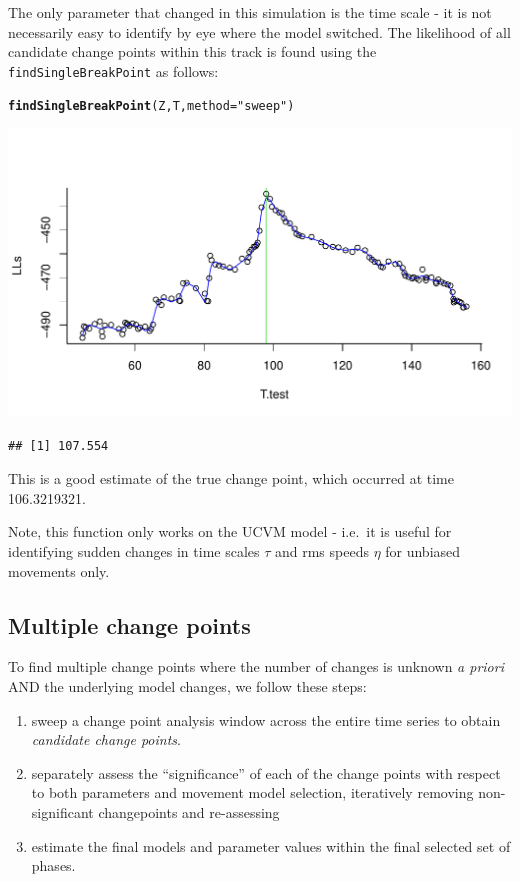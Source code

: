 \documentclass[10pt]{article}\usepackage[]{graphicx}\usepackage[]{color}
\makeatletter
\def\maxwidth{ %
  \ifdim\Gin@nat@width>\linewidth
    \linewidth
  \else
    \Gin@nat@width
  \fi
}
\newcommand{\hlstr}[1]{\textcolor[rgb]{0.192,0.494,0.8}{#1}}%
\newcommand{\hlstd}[1]{\textcolor[rgb]{0.345,0.345,0.345}{#1}}%
\newcommand{\hlkwc}[1]{\textcolor[rgb]{0.333,0.667,0.333}{#1}}%
\newcommand{\hlkwd}[1]{\textcolor[rgb]{0.737,0.353,0.396}{\textbf{#1}}}%
\newenvironment{kframe}{%
 \def\at@end@of@kframe{}%
 \ifinner\ifhmode%
  \def\at@end@of@kframe{\end{minipage}}%
  \begin{minipage}{\columnwidth}%
 \fi\fi%
 \def\FrameCommand##1{\hskip\@totalleftmargin \hskip-\fboxsep
 \colorbox{shadecolor}{##1}\hskip-\fboxsep
     \hskip-\linewidth \hskip-\@totalleftmargin \hskip\columnwidth}%
 \MakeFramed {\advance\hsize-\width
   \@totalleftmargin\z@ \linewidth\hsize
   \@setminipage}}%
 {\par\unskip\endMakeFramed%
 \at@end@of@kframe}
\newenvironment{knitrout}{}{} %
\makeatother
\begin{document}
\noindent The only parameter that changed in this simulation is the time scale - it is not necessarily easy to identify by eye where the model switched. The likelihood of all candidate change points within this track is found using the \texttt{findSingleBreakPoint} as follows:

\begin{knitrout}
\color{fgcolor}\begin{kframe}
\begin{alltt}
\hlkwd{findSingleBreakPoint}\hlstd{(Z,T,} \hlkwc{method} \hlstd{=} \hlstr{"sweep"}\hlstd{)}
\end{alltt}
\end{kframe}
\includegraphics[width=\maxwidth]{figure/unnamed-chunk-11-1} 
\begin{kframe}\begin{verbatim}
## [1] 107.554
\end{verbatim}
\end{kframe}
\end{knitrout}

This is a good estimate of the true change point, which occurred at time 106.3219321.

Note, this function only works on the UCVM model - i.e.~it is useful for identifying sudden changes in time scales $\tau$ and rms speeds $\eta$ for unbiased movements only. 


\subsection{Multiple change points}

To find multiple change points where the number of changes is unknown \emph{a priori} AND the underlying model changes, we follow these steps:
\begin{enumerate}
\item  sweep a change point analysis window across the entire time series to obtain \emph{candidate change points}.   
\item separately assess the ``significance'' of each of the change points with respect to both parameters and movement model selection, iteratively removing non-significant changepoints and re-assessing
\item estimate the final models and parameter values within the final selected set of phases.
\end{enumerate}
\end{document}
